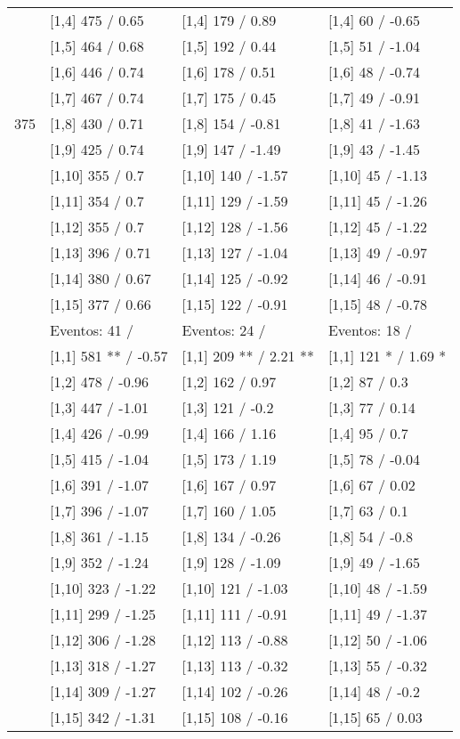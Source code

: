 \begin{table}
\begin{tabular}[t]{llll}
\addlinespace
 & {}[1,4] 475  / 0.65 & {}[1,4] 179  / 0.89 & {}[1,4] 60  / -0.65\\
 & {}[1,5] 464  / 0.68 & {}[1,5] 192  / 0.44 & {}[1,5] 51  / -1.04\\
 & {}[1,6] 446  / 0.74 & {}[1,6] 178  / 0.51 & {}[1,6] 48  / -0.74\\
 & {}[1,7] 467  / 0.74 & {}[1,7] 175  / 0.45 & {}[1,7] 49  / -0.91\\
375 & {}[1,8] 430  / 0.71 & {}[1,8] 154  / -0.81 & {}[1,8] 41  / -1.63\\
\addlinespace
 & {}[1,9] 425  / 0.74 & {}[1,9] 147  / -1.49 & {}[1,9] 43  / -1.45\\
 & {}[1,10] 355  / 0.7 & {}[1,10] 140  / -1.57 & {}[1,10] 45  / -1.13\\
 & {}[1,11] 354  / 0.7 & {}[1,11] 129  / -1.59 & {}[1,11] 45  / -1.26\\
 & {}[1,12] 355  / 0.7 & {}[1,12] 128  / -1.56 & {}[1,12] 45  / -1.22\\
 & {}[1,13] 396  / 0.71 & {}[1,13] 127  / -1.04 & {}[1,13] 49  / -0.97\\
\addlinespace
 & {}[1,14] 380  / 0.67 & {}[1,14] 125  / -0.92 & {}[1,14] 46  / -0.91\\
 & {}[1,15] 377  / 0.66 & {}[1,15] 122  / -0.91 & {}[1,15] 48  / -0.78\\
 & Eventos:  41 / & Eventos:  24 / & Eventos:  18 /\\
 & {}[1,1] 581 ** / -0.57 & {}[1,1] 209 ** / 2.21 ** & {}[1,1] 121 * / 1.69 *\\
 & {}[1,2] 478  / -0.96 & {}[1,2] 162  / 0.97 & {}[1,2] 87  / 0.3\\
\addlinespace
 & {}[1,3] 447  / -1.01 & {}[1,3] 121  / -0.2 & {}[1,3] 77  / 0.14\\
 & {}[1,4] 426  / -0.99 & {}[1,4] 166  / 1.16 & {}[1,4] 95  / 0.7\\
 & {}[1,5] 415  / -1.04 & {}[1,5] 173  / 1.19 & {}[1,5] 78  / -0.04\\
 & {}[1,6] 391  / -1.07 & {}[1,6] 167  / 0.97 & {}[1,6] 67  / 0.02\\
 & {}[1,7] 396  / -1.07 & {}[1,7] 160  / 1.05 & {}[1,7] 63  / 0.1\\
\addlinespace
500 & {}[1,8] 361  / -1.15 & {}[1,8] 134  / -0.26 & {}[1,8] 54  / -0.8\\
 & {}[1,9] 352  / -1.24 & {}[1,9] 128  / -1.09 & {}[1,9] 49  / -1.65\\
 & {}[1,10] 323  / -1.22 & {}[1,10] 121  / -1.03 & {}[1,10] 48  / -1.59\\
 & {}[1,11] 299  / -1.25 & {}[1,11] 111  / -0.91 & {}[1,11] 49  / -1.37\\
 & {}[1,12] 306  / -1.28 & {}[1,12] 113  / -0.88 & {}[1,12] 50  / -1.06\\
\addlinespace
 & {}[1,13] 318  / -1.27 & {}[1,13] 113  / -0.32 & {}[1,13] 55  / -0.32\\
 & {}[1,14] 309  / -1.27 & {}[1,14] 102  / -0.26 & {}[1,14] 48  / -0.2\\
 & {}[1,15] 342  / -1.31 & {}[1,15] 108  / -0.16 & {}[1,15] 65  / 0.03\\
\bottomrule
\end{tabular}
\end{table}

